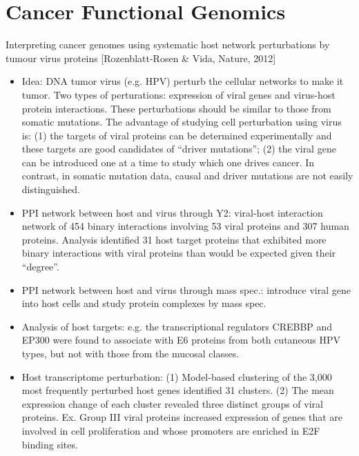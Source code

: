 \documentclass{report}
\begin{document}
\chapter{Cancer Functional Genomics}

Interpreting cancer genomes using systematic host network perturbations by tumour virus proteins [Rozenblatt-Rosen \& Vida, Nature, 2012]
\begin{itemize}
	\item Idea: DNA tumor virus (e.g. HPV) perturb the cellular networks to make it tumor. Two types of perturations: expression of viral genes and virus-host protein interactions. These perturbations should be similar to those from somatic mutations. The advantage of studying cell perturbation using virus is: (1) the targets of viral proteins can be determined experimentally and these targets are good candidates of ``driver mutations''; (2) the viral gene can be introduced one at a time to study which one drives cancer. In contrast, in somatic mutation data, causal and driver mutations are not easily distinguished.
	\item PPI network between host and virus through Y2: viral-host interaction network of 454 binary interactions involving 53 viral proteins and 307 human proteins. Analysis identified 31 host target proteins that exhibited more binary interactions with viral proteins than would be expected given their ``degree''.
	\item PPI network between host and virus through mass spec.: introduce viral gene into host cells and study protein complexes by mass spec.
	\item Analysis of host targets: e.g. the transcriptional regulators CREBBP and EP300 were found to associate with E6 proteins from both cutaneous HPV types, but not with those from the mucosal classes.
	\item Host transcriptome perturbation: (1) Model-based clustering of the 3,000 most frequently perturbed host genes identified 31 clusters. (2) The mean expression change of each cluster revealed three distinct groups of viral proteins. Ex. Group III viral proteins increased expression of genes that are involved in cell proliferation and whose promoters are enriched in E2F binding sites.
\end{itemize}
\end{document}

